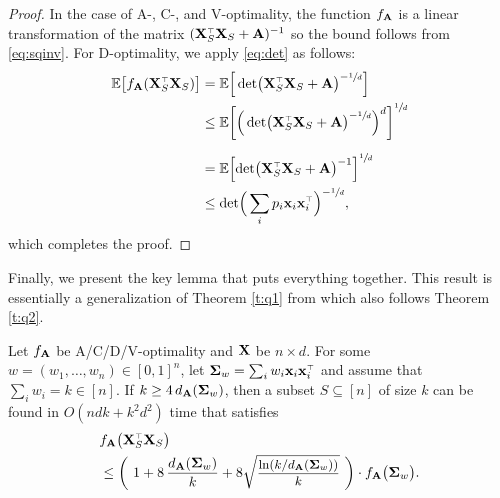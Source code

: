 \documentclass[thesis.tex]{subfiles}
\begin{document}
\begin{proof}
  In the case of A-, C-, and V-optimality, the function $f_{\mathbf A}$ is a
  linear transformation of the matrix $(\X_S^\top\X_S+\A)^{-1}$ so the
  bound follows from \eqref{eq:sqinv}. For D-optimality, we apply
  \eqref{eq:det} as follows:
  \begin{align*}
    \E\big[f_{\A}(\X_S^\top\X_S)\big]
    & = \E\Big[\det\!\big(\X_S^\top\X_S+\A\big)^{-\sfrac1d}\Big] \\
    &\leq
     \E\bigg[\Big(\det\!\big(\X_S^\top\X_S+\A\big)^{-\sfrac1d}\Big)^d\bigg]^{\sfrac1d} \\
    \\ &=  \E\Big[\!\det\!\big(\X_S^\top\X_S+\A\big)^{-1}\Big]^{\sfrac1d}\\
       &\leq
         \det\!\Big(\sum_i p_i\x_i\x_i^\top\Big)^{-\sfrac1d},
  \end{align*}
  which completes the proof.
\end{proof}
Finally, we present the key lemma that puts everything together. This
result is essentially a generalization of Theorem \ref{t:q1} from
which also follows Theorem \ref{t:q2}.
\begin{lemma}\label{l:guarantees}
  Let $f_{\mathbf A}$ be A/C/D/V-optimality and $\mathbf X$ be $n\times
  d$.  For some $w=(w_1,\dots,w_n)\in[0,1]^n$, let
  $\Sigmab_w=\sum_iw_i\x_i\x_i^\top$ and assume that
  $\sum_i w_i=k\in[n]$. If $k\geq 4\,d_{\mathbf A}(\mathbf{\Sigma}_w)$, then a
subset $S\subseteq[n]$ of size $k$ can be found in $O(ndk+k^2d^2)$ time that satisfies
  \begin{align*}
    &f_{\A}\big(\X_S^\top\X_S\big)  \\
    &\leq \bigg(\ 1+8\,\frac{d_{\A}(\Sigmab_w)}{k} + 8\sqrtshort{\frac{\ln (k/d_{\A}(\Sigmab_w))}{k}}\ \bigg)\cdot f_{\A}\big(\Sigmab_w\big).
  \end{align*}
  \end{lemma}
\end{document}
